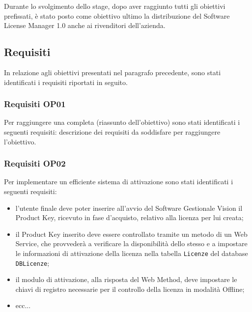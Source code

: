 Durante lo svolgimento dello stage, dopo aver raggiunto tutti gli obiettivi prefissati, è stato posto come obiettivo ultimo la distribuzione del Software License Manager 1.0 anche ai rivenditori dell'azienda.

\subsection{Requisiti}

In relazione agli obiettivi presentati nel paragrafo precedente, sono stati identificati i requisiti riportati in seguito.

\subsubsection{Requisiti OP01}
Per raggiungere una completa (riassunto dell'obiettivo) sono stati identificati i seguenti requisiti:
descrizione dei requisiti da soddisfare per raggiungere l'obiettivo.
\subsubsection{Requisiti OP02} 
Per implementare un efficiente sistema di attivazione sono stati identificati i seguenti requisiti:
\begin{itemize}
\item l'utente finale deve poter inserire all'avvio del Software Gestionale Vision il Product Key, ricevuto in fase d'acquisto, relativo alla licenza per lui creata;
\item il Product Key inserito deve essere controllato tramite un metodo di un Web Service, che provvederà a verificare la disponibilità dello stesso e a impostare le informazioni di attivazione della licenza nella tabella \texttt{Licenze} del database \texttt{DBLicenze};
\item il modulo di attivazione, alla risposta del Web Method, deve impostare le chiavi di registro necessarie per il controllo della licenza in modalità Offline;
\item ecc...
\end{itemize} 
